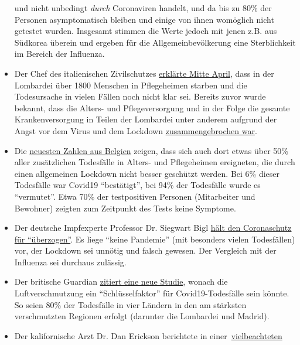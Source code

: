 \begin{itemize}
  und nicht unbedingt \emph{durch} Coronaviren handelt, und da bis zu
  80\% der Personen asymptomatisch bleiben und einige von ihnen
  womöglich nicht getestet wurden. Insgesamt stimmen die Werte jedoch
  mit jenen z.B. aus Südkorea überein und ergeben für die
  Allgemeinbevölkerung eine Sterblichkeit im Bereich der Influenza.
\item
  Der Chef des italienischen Zivilschutzes
  \href{https://www.theguardian.com/world/2020/apr/16/italian-police-broaden-care-home-coronavirus-milan}{erklärte
  Mitte April}, dass in der Lombardei über 1800 Menschen in Pflegeheimen
  starben und die Todesursache in vielen Fällen noch nicht klar sei.
  Bereits zuvor wurde bekannt, dass die Alters- und Pflegeversorgung und
  in der Folge die gesamte Krankenversorgung in Teilen der Lombardei
  unter anderem aufgrund der Angst vor dem Virus und dem Lockdown
  \href{https://swprs.org/covid19-bericht-aus-italien/}{zusammengebrochen
  war}.
\item
  Die
  \href{https://covid-19.sciensano.be/sites/default/files/Covid19/Meest\%20recente\%20update.pdf}{neuesten
  Zahlen aus Belgien} zeigen, dass sich auch dort etwas über 50\% aller
  zusätzlichen Todesfälle in Alters- und Pflegeheimen ereigneten, die
  durch einen allgemeinen Lockdown nicht besser geschützt werden. Bei
  6\% dieser Todesfälle war Covid19 ``bestätigt'', bei 94\% der
  Todesfälle wurde es ``vermutet''. Etwa 70\% der testpositiven Personen
  (Mitarbeiter und Bewohner) zeigten zum Zeitpunkt des Tests keine
  Symptome.
\item
  Der deutsche Impfexperte Professor Dr. Siegwart Bigl
  \href{https://www.pressreader.com/germany/dresdner-neueste-nachrichten/20200423/281496458428447}{hält
  den Coronaschutz für ``überzogen''}. Es liege ``keine Pandemie'' (mit
  besonders vielen Todesfällen) vor, der Lockdown sei unnötig und falsch
  gewesen. Der Vergleich mit der Influenza sei durchaus zulässig.
\item
  Der britische Guardian
  \href{https://www.theguardian.com/environment/2020/apr/20/air-pollution-may-be-key-contributor-to-covid-19-deaths-study?utm_medium}{zitiert
  eine neue Studie}, wonach die Luftverschmutzung ein
  ``Schlüsselfaktor'' für Covid19-Todesfälle sein könnte. So seien 80\%
  der Todesfälle in vier Ländern in den am stärksten verschmutzten
  Regionen erfolgt (darunter die Lombardei und Madrid).
\item
  Der kalifornische Arzt Dr. Dan Erickson berichtete in
  einer~\href{https://www.turnto23.com/news/coronavirus/video-interview-with-dr-dan-erickson-and-dr-artin-massihi-taken-down-from-youtube}{vielbeachteten
}
\end{itemize}
